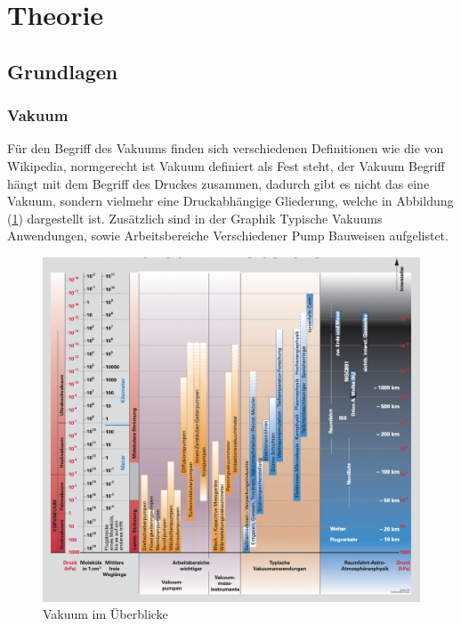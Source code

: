 \section{Theorie}
\label{sec:Theorie}

\subsection{Grundlagen}
\subsubsection{Vakuum}
Für den Begriff des Vakuums finden sich verschiedenen Definitionen
wie die von Wikipedia, \cite[Vakuum ist in der technischen Praxis ein Raum mit weitgehender Abwesenheit von Materie.]{dewiki}
normgerecht ist Vakuum definiert als 
\cite[der Zustand eines Gases, 
wenn in einem Behälter der Druck des Gases 
und damit die Teilchenzahldichte niedriger ist als außerhalb oder wenn der Druck des Gases niedriger ist als 300 mbar,
d. h. kleiner als der niedrigste auf der Erdoberfläche vorkommende Atmosphärendruck.]{DIN} 
Fest steht, der Vakuum Begriff hängt mit dem Begriff des Druckes zusammen,
dadurch gibt es nicht das eine Vakuum, sondern vielmehr eine Druckabhängige Gliederung,
welche in Abbildung (\ref{fig:Vakuum}) dargestellt ist. 
Zusätzlich sind in der Graphik Typische Vakuums Anwendungen,
sowie Arbeitsbereiche Verschiedener Pump Bauweisen aufgelistet.
\begin{figure}[ht]
    \centering
    \includegraphics[width=\textwidth]{abb/Vakuum.png}
    \caption{Vakuum im Überblicke \cite{Pfeifer}}
    \label{fig:Vakuum}
\end{figure}

